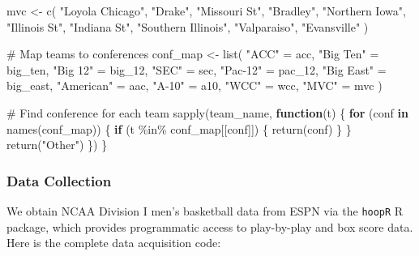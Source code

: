 \documentclass[
  letterpaper,
  DIV=11,
  numbers=noendperiod]{scrartcl}
\newenvironment{Shaded}{\begin{snugshade}}{\end{snugshade}}
\newcommand{\CommentTok}[1]{\textcolor[rgb]{0.37,0.37,0.37}{#1}}
\newcommand{\ControlFlowTok}[1]{\textcolor[rgb]{0.00,0.23,0.31}{\textbf{#1}}}
\newcommand{\FunctionTok}[1]{\textcolor[rgb]{0.28,0.35,0.67}{#1}}
\newcommand{\NormalTok}[1]{\textcolor[rgb]{0.00,0.23,0.31}{#1}}
\newcommand{\OtherTok}[1]{\textcolor[rgb]{0.00,0.23,0.31}{#1}}
\newcommand{\SpecialCharTok}[1]{\textcolor[rgb]{0.37,0.37,0.37}{#1}}
\newcommand{\StringTok}[1]{\textcolor[rgb]{0.13,0.47,0.30}{#1}}
\begin{document}
\begin{Shaded}
\begin{Highlighting}[]
\NormalTok{    mvc }\OtherTok{\textless{}{-}} \FunctionTok{c}\NormalTok{(}
        \StringTok{"Loyola Chicago"}\NormalTok{, }\StringTok{"Drake"}\NormalTok{, }\StringTok{"Missouri St"}\NormalTok{, }\StringTok{"Bradley"}\NormalTok{, }\StringTok{"Northern Iowa"}\NormalTok{,}
        \StringTok{"Illinois St"}\NormalTok{, }\StringTok{"Indiana St"}\NormalTok{, }\StringTok{"Southern Illinois"}\NormalTok{, }\StringTok{"Valparaiso"}\NormalTok{, }\StringTok{"Evansville"}
\NormalTok{    )}

    \CommentTok{\# Map teams to conferences}
\NormalTok{    conf\_map }\OtherTok{\textless{}{-}} \FunctionTok{list}\NormalTok{(}
        \StringTok{"ACC"} \OtherTok{=}\NormalTok{ acc,}
        \StringTok{"Big Ten"} \OtherTok{=}\NormalTok{ big\_ten,}
        \StringTok{"Big 12"} \OtherTok{=}\NormalTok{ big\_12,}
        \StringTok{"SEC"} \OtherTok{=}\NormalTok{ sec,}
        \StringTok{"Pac{-}12"} \OtherTok{=}\NormalTok{ pac\_12,}
        \StringTok{"Big East"} \OtherTok{=}\NormalTok{ big\_east,}
        \StringTok{"American"} \OtherTok{=}\NormalTok{ aac,}
        \StringTok{"A{-}10"} \OtherTok{=}\NormalTok{ a10,}
        \StringTok{"WCC"} \OtherTok{=}\NormalTok{ wcc,}
        \StringTok{"MVC"} \OtherTok{=}\NormalTok{ mvc}
\NormalTok{    )}

    \CommentTok{\# Find conference for each team}
    \FunctionTok{sapply}\NormalTok{(team\_name, }\ControlFlowTok{function}\NormalTok{(t) \{}
        \ControlFlowTok{for}\NormalTok{ (conf }\ControlFlowTok{in} \FunctionTok{names}\NormalTok{(conf\_map)) \{}
            \ControlFlowTok{if}\NormalTok{ (t }\SpecialCharTok{\%in\%}\NormalTok{ conf\_map[[conf]]) \{}
                \FunctionTok{return}\NormalTok{(conf)}
\NormalTok{            \}}
\NormalTok{        \}}
        \FunctionTok{return}\NormalTok{(}\StringTok{"Other"}\NormalTok{)}
\NormalTok{    \})}
\NormalTok{\}}
\end{Highlighting}
\end{Shaded}

\subsubsection{Data Collection}\label{data-collection}

We obtain NCAA Division I men's basketball data from ESPN via the
\texttt{hoopR} R package, which provides programmatic access to
play-by-play and box score data. Here is the complete data acquisition
code:
\end{document}
